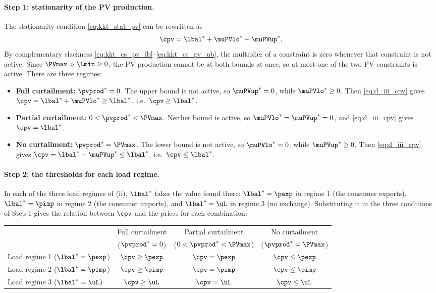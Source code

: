\paragraph{Step 1: stationarity of the PV production.}
The stationarity condition \eqref{eq:kkt_stat_pv} can be rewritten as
\begin{equation}
    \cpv = {\lbal}^* + {\muPVlo}^* - {\muPVup}^*.
    \label{eq:d_iii_cpv}
\end{equation}
By complementary slackness \eqref{eq:kkt_cs_pv_lb}--\eqref{eq:kkt_cs_pv_ub}, the multiplier of
a constraint is zero whenever that constraint is not active. Since $\PVmax > \Lmin \geq 0$,
the PV production cannot be at both bounds at once, so at most one of the two PV constraints
is active. There are three regimes:
\begin{itemize}
    \item \textbf{Full curtailment:} ${\pvprod}^* = 0$. The upper bound is not active, so
    ${\muPVup}^* = 0$, while ${\muPVlo}^* \geq 0$. Then \eqref{eq:d_iii_cpv} gives
    $\cpv = {\lbal}^* + {\muPVlo}^* \geq {\lbal}^*$, i.e.\ $\cpv \geq {\lbal}^*$.
    \item \textbf{Partial curtailment:} $0 < {\pvprod}^* < \PVmax$. Neither bound is active,
    so ${\muPVlo}^* = {\muPVup}^* = 0$, and \eqref{eq:d_iii_cpv} gives $\cpv = {\lbal}^*$.
    \item \textbf{No curtailment:} ${\pvprod}^* = \PVmax$. The lower bound is not active, so
    ${\muPVlo}^* = 0$, while ${\muPVup}^* \geq 0$. Then \eqref{eq:d_iii_cpv} gives
    $\cpv = {\lbal}^* - {\muPVup}^* \leq {\lbal}^*$, i.e.\ $\cpv \leq {\lbal}^*$.
\end{itemize}

\paragraph{Step 2: the thresholds for each load regime.}
In each of the three load regimes of (ii), ${\lbal}^*$ takes the value found there:
${\lbal}^* = \pexp$ in regime 1 (the consumer exports), ${\lbal}^* = \pimp$ in regime 2 (the
consumer imports), and ${\lbal}^* = \uL$ in regime 3 (no exchange). Substituting it in the three
conditions of Step 1 gives the relation between $\cpv$ and the prices for each combination:
\begin{center}
\begin{tabular}{lccc}
    \toprule
    & Full curtailment & Partial curtailment & No curtailment \\
    & (${\pvprod}^* = 0$) & ($0 < {\pvprod}^* < \PVmax$) & (${\pvprod}^* = \PVmax$) \\
    \midrule
    Load regime 1 (${\lbal}^* = \pexp$) & $\cpv \geq \pexp$ & $\cpv = \pexp$ & $\cpv \leq \pexp$ \\
    Load regime 2 (${\lbal}^* = \pimp$) & $\cpv \geq \pimp$ & $\cpv = \pimp$ & $\cpv \leq \pimp$ \\
    Load regime 3 (${\lbal}^* = \uL$) & $\cpv \geq \uL$ & $\cpv = \uL$ & $\cpv \leq \uL$ \\
    \bottomrule
\end{tabular}
\end{center}

